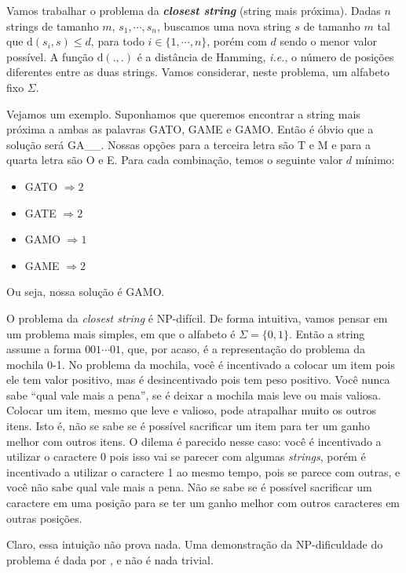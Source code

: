 Vamos trabalhar o problema da \textbf{\textit{closest string}} (string mais próxima). Dadas $n$ strings de tamanho $m$, $s_1, \cdots, s_n$, buscamos uma nova string $s$ de tamanho $m$ tal que $\text{d}(s_i, s) \le d$, para todo $i \in \{1, \cdots, n\}$, porém com $d$ sendo o menor valor possível. A função $\text{d}(., .)$ é a distância de Hamming, \textit{i.e.}, o número de posições diferentes entre as duas strings. Vamos considerar, neste problema, um alfabeto fixo $\Sigma$.

Vejamos um exemplo. Suponhamos que queremos encontrar a string mais próxima a ambas as palavras GATO, GAME e GAMO. Então é óbvio que a solução será GA\_\_. Nossas opções para a terceira letra são T e M e para a quarta letra são O e E. Para cada combinação, temos o seguinte valor $d$ mínimo:
\begin{itemize}
    \item GATO $\Rightarrow 2$
    \item GATE $\Rightarrow 2$
    \item GAMO $\Rightarrow 1$
    \item GAME $\Rightarrow 2$
\end{itemize}
Ou seja, nossa solução é GAMO.

O problema da \textit{closest string} é NP-difícil.
De forma intuitiva, vamos pensar em um problema mais simples, em que o alfabeto é $\Sigma = \{0, 1\}$. Então a string assume a forma $001 \cdots 01$, que, por acaso, é a representação do problema da mochila 0-1. No problema da mochila, você é incentivado a colocar um item pois ele tem valor positivo, mas é desincentivado pois tem peso positivo. Você nunca sabe ``qual vale mais a pena'', se é deixar a mochila mais leve ou mais valiosa. Colocar um item, mesmo que leve e valioso, pode atrapalhar muito os outros itens. Isto é, não se sabe se é possível sacrificar um item para ter um ganho melhor com outros itens. O dilema é parecido nesse caso: você é incentivado a utilizar o caractere 0 pois isso vai se parecer com algumas \textit{strings}, porém é incentivado a utilizar o caractere 1 ao mesmo tempo, pois se parece com outras, e você não sabe qual vale mais a pena. Não se sabe se é possível sacrificar um caractere em uma posição para se ter um ganho melhor com outros caracteres em outras posições.

Claro, essa intuição não prova nada. Uma demonstração da NP-dificuldade do problema é dada por \cite{frances1997covering}, e não é nada trivial.